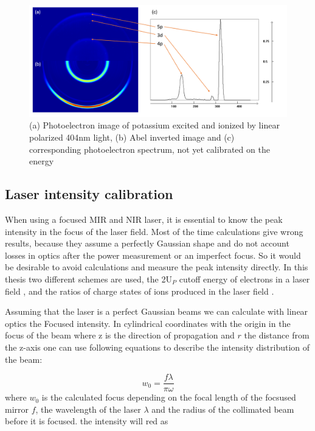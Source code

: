 \begin{figure}
\centering
\includegraphics[scale=0.5]{../images/potassium_calib.png}
\caption{(a) Photoelectron image of potassium excited and ionized by linear polarized 404nm light, (b) Abel inverted image and (c) corresponding photoelectron spectrum, not yet calibrated on the energy}
\end{figure}


\subsection{Laser intensity calibration}
When using a focused MIR and NIR laser, it is essential to know the peak intensity in the focus of the laser field. Most of the time calculations give wrong results, because they assume a perfectly Gaussian shape and do not account losses in optics after the power measurement or an imperfect focus. So it would be desirable to avoid calculations and measure the peak intensity directly. In this thesis two different schemes are used, the 2U$_P$ cutoff energy of electrons in a laser field \cite{Becker_2018}, \cite{becker_vuv_1996} and the ratios of charge states of ions produced in the laser field \cite{augst_laser_1991}.

Assuming that the laser is a perfect Gaussian beams we can calculate with linear optics the Focused intensity. In cylindrical coordinates with the origin in the focus of the beam where z is the direction of propagation and $r$ the distance from the z-axis one can use following equations to describe the intensity distribution of the beam:

\begin{equation}
w_{0}=\dfrac{f\lambda}{\pi \omega}
\end{equation}
 where $w_{0}$ is the calculated focus depending on the focal length of the focsused mirror $f$, the wavelength of the laser $\lambda$ and the radius of the collimated beam before it is focused.
the intensity will red as

